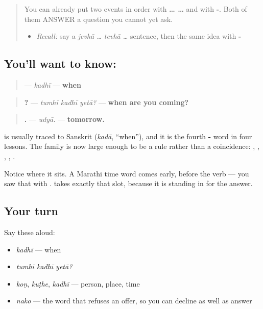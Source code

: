 \begin{quote}
You can already put two events in order with \textbf{ …  …} and with \textbf{-}. Both of them ANSWER a question you cannot yet ask.

\begin{itemize}
\raggedright
  \item \emph{Recall:} say a \emph{jevhā … tevhā …} sentence, then the same idea with \textbf{-}
\end{itemize}
\end{quote}

\subsection*{You'll want to know: }
\begin{quote}
\textbf{} — \emph{kadhī} — \textbf{when}
\end{quote}

\begin{quote}
\textbf{  ?} — \emph{tumhī kadhī yetā?} — \textbf{when are you coming?}
\end{quote}

\begin{quote}
\textbf{.} — \emph{udyā.} — \textbf{tomorrow.}
\end{quote}

\textbf{} is usually traced to Sanskrit \textbf{} (\emph{kadā}, \textquotedblleft{}when\textquotedblright{}), and it is the fourth \textbf{-} word in four lessons. The family is now large enough to be a rule rather than a coincidence: \textbf{}, \textbf{}, \textbf{}, \textbf{}, \textbf{}.

Notice where it sits. A Marathi time word comes early, before the verb — you saw that with \textbf{ }. \textbf{} takes exactly that slot, because it is standing in for the answer.

\subsection*{Your turn}
Say these aloud:

\begin{itemize}
\raggedright
  \item \emph{kadhī} — when
  \item \emph{tumhī kadhī yetā?}
  \item \emph{koṇ}, \emph{kuṭhe}, \emph{kadhī} — person, place, time
  \item \emph{nako} — the word that refuses an offer, so you can decline as well as answer
\end{itemize}

